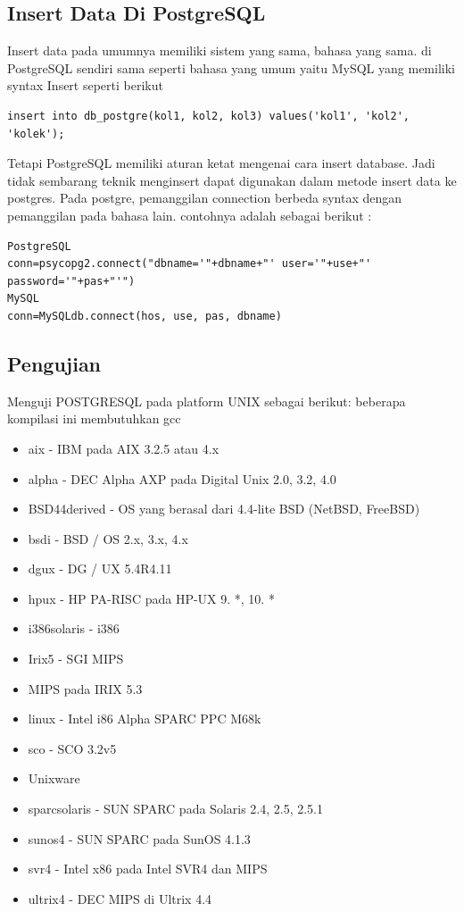 \subsection{Insert Data Di PostgreSQL}
Insert data pada umumnya memiliki sistem yang sama, bahasa yang sama. di PostgreSQL sendiri sama seperti bahasa yang umum yaitu MySQL yang memiliki syntax Insert seperti berikut
\begin{verbatim}
insert into db_postgre(kol1, kol2, kol3) values('kol1', 'kol2', 'kolek');
\end{verbatim}
Tetapi PostgreSQL memiliki aturan ketat mengenai cara insert database. Jadi tidak sembarang teknik menginsert dapat digunakan dalam metode insert data ke postgres. Pada postgre, pemanggilan connection berbeda syntax dengan pemanggilan pada bahasa lain. contohnya adalah sebagai berikut : 

\begin{verbatim}
PostgreSQL
conn=psycopg2.connect("dbname='"+dbname+"' user='"+use+"' password='"+pas+"'")
MySQL
conn=MySQLdb.connect(hos, use, pas, dbname)
\end{verbatim}

\subsection{Pengujian}
Menguji POSTGRESQL pada platform UNIX sebagai berikut: 
beberapa kompilasi ini membutuhkan gcc
\begin {itemize} 
	\item aix - IBM pada AIX 3.2.5 atau 4.x
	\item alpha - DEC Alpha AXP pada Digital Unix 2.0, 3.2, 4.0
	\item BSD44derived - OS yang berasal dari 4.4-lite BSD (NetBSD, FreeBSD)
	\item bsdi - BSD / OS 2.x, 3.x, 4.x
	\item dgux - DG / UX 5.4R4.11
	\item hpux - HP PA-RISC pada HP-UX 9. *, 10. *
	\item i386solaris - i386
	\item Irix5 - SGI MIPS
	\item MIPS pada IRIX 5.3
	\item linux - Intel i86 Alpha SPARC PPC M68k
	\item sco - SCO 3.2v5
	\item Unixware
	\item sparcsolaris - SUN SPARC pada Solaris 2.4, 2.5, 2.5.1
	\item sunos4 - SUN SPARC pada SunOS 4.1.3
	\item svr4 - Intel x86 pada Intel SVR4 dan MIPS
	\item ultrix4 - DEC MIPS di Ultrix 4.4
\end {itemize}


